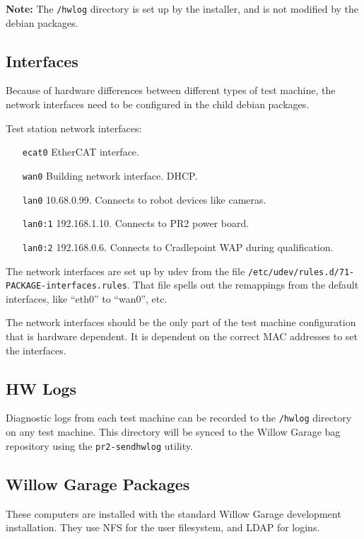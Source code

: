 \documentclass[11pt]{report}
\begin{document}
{\bf Note:} The \texttt{/hwlog} directory is set up by the installer, and is not modified by the debian packages.

\subsection{Interfaces}

Because of hardware differences between different types of test machine, the network interfaces need to be configured in the child debian packages.

Test station network interfaces:
\begin{itemize}
\item [\texttt{ecat0}] EtherCAT interface.
\item [\texttt{wan0}] Building network interface. DHCP.
\item [\texttt{lan0}] 10.68.0.99. Connects to robot devices like cameras.
\item [\texttt{lan0:1}] 192.168.1.10. Connects to PR2 power board.
\item [\texttt{lan0:2}] 192.168.0.6. Connects to Cradlepoint WAP during qualification.
\end{itemize}

The network interfaces are set up by udev from the file \texttt{/etc/udev/rules.d/71-PACKAGE-interfaces.rules}. That file spells out the remappings from the default interfaces, like ``eth0'' to ``wan0'', etc.

The network interfaces should be the only part of the test machine configuration that is hardware dependent. It is dependent on the correct MAC addresses to set the interfaces.

\subsection{HW Logs}

Diagnostic logs from each test machine can be recorded to the \texttt{/hwlog} directory on any test machine. This directory will be synced to the Willow Garage bag repository using the \texttt{pr2-sendhwlog} utility. 

\subsection{Willow Garage Packages}

These computers are installed with the standard Willow Garage development installation. They use NFS for the user filesystem, and LDAP for logins. 
\end{document}
